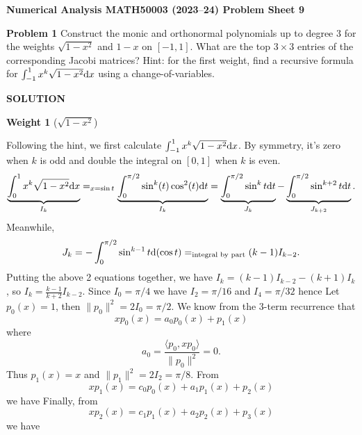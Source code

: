 \documentclass[12pt,a4paper]{article}
\def\endash{–}
\begin{document}
\textbf{Numerical Analysis MATH50003 (2023\ensuremath{\endash}24) Problem Sheet 9}

\textbf{Problem 1} Construct the monic and orthonormal polynomials up to degree $3$ for the weights $\sqrt{1-x^2}$ and $1-x$ on $[-1,1]$. What are the top $3 \ensuremath{\times} 3$ entries of the corresponding Jacobi matrices? Hint: for the first weight, find a recursive formula for $\int_{-1}^1 x^k \sqrt{1-x^2} {\rm d} x$ using a change-of-variables.

\textbf{SOLUTION}

\textbf{Weight 1} ($\sqrt{1-x^2}$)

Following the hint, we first calculate $\int_{-1}^1 x^k\sqrt{1-x^2}{\rm d}x$. By symmetry, it's zero when $k$ is odd and double the integral on $[0,1]$ when $k$ is even.
\[
\underbrace{\int_0^1 x^k\sqrt{1-x^2}{\rm d}x}_{I_k} = _{x=\sin t}\underbrace{\int_0^{\ensuremath{\pi}/2}\sin^k(t)\cos^2(t){\rm d}t}_{I_k}=\underbrace{\int_0^{\ensuremath{\pi}/2}\sin^k t{\rm d}t}_{J_k}-\underbrace{\int_0^{\ensuremath{\pi}/2}\sin^{k+2}t{\rm d}t}_{J_{k+2}}.
\]
Meanwhile,
\[
J_k=-\int_0^{\ensuremath{\pi}/2}\sin^{k-1}t{\rm d}(\cos t)=_{\text{integral by part}}(k-1)I_{k-2}.
\]
Putting the above 2 equations together, we have $I_k=(k-1)I_{k-2}-(k+1)I_k$, so $I_k=\frac{k-1}{k+2}I_{k-2}$. Since $I_0=\ensuremath{\pi}/4$ we have $I_2 = {\ensuremath{\pi} / 16}$ and $I_4 = \ensuremath{\pi}/32$ hence
Let $p_0(x)=1$, then $\|p_0\|^2=2I_0=\ensuremath{\pi}/2$. We know from the 3-term recurrence that
\[
xp_0(x)=a_0p_0(x)+p_1(x)
\]
where
\[
a_0=\frac{\ensuremath{\langle} p_0,xp_0\ensuremath{\rangle}}{\|p_0\|^2}=0.
\]
Thus $p_1(x)=x$ and $\|p_1\|^2=2I_2=\ensuremath{\pi}/8$. From
\[
xp_1(x)=c_0p_0(x)+a_1p_1(x)+p_2(x)
\]
we have
Finally, from
\[
xp_2(x)=c_1p_1(x)+a_2p_2(x)+p_3(x)
\]
we have
\end{document}
